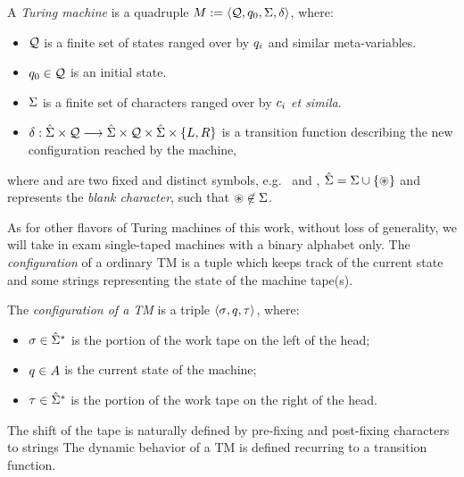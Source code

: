 \begin{defn}\label{df:TM}
A \emph{Turing machine} is a quadruple
$M:= \langle \textcolor{black}{\mathcal{Q}}, \textcolor{black}{q_0}, \textcolor{black}{\Sigma}, \textcolor{black}{\delta} \rangle$, where:
\begin{itemize}
\itemsep0em
\item $\textcolor{black}{\mathcal{Q}}$ is a finite set of states ranged over by
$\textcolor{black}{q_i}$ and similar meta-variables.
%
\item $\textcolor{black}{q_0} \in \textcolor{black}{\mathcal{Q}}$ is an initial state.
%
\item $\textcolor{black}{\Sigma}$ is a finite set of characters
ranged over by $\textcolor{black}{c_i}$ \emph{et simila}.
%
\item $\textcolor{black}{\delta}: \textcolor{black}{\hat{\Sigma}}
\times \textcolor{black}{\mathcal{Q}}
\longrightarrow \textcolor{black}{\hat{\Sigma}} \times \textcolor{black}{\mathcal{Q}} \times \textcolor{black}{\hat{\Sigma}} \times \{\textcolor{black}{L},\textcolor{black}{R}\}$
is a transition function describing the new configuration
reached by the machine,
\end{itemize}
where   and  are two fixed and distinct symbols,
e.g.~\m{$\zero$} and \m{$\one$},
$\textcolor{black}{\hat{\Sigma}}=\textcolor{black}{\Sigma} \cup \{\textcolor{black}{\circledast}\}$
and \m{$\blank$} represents the
\emph{blank character}, such that $\textcolor{black}{\circledast} \not \in
\textcolor{black}{\Sigma}$.
\end{defn}
%
\noindent
As for other flavors of Turing machines of this work,
without loss of generality, we will take in exam single-taped machines
with a binary alphabet only.
%
%
%
%
%
%
%
The \emph{configuration} of a ordinary TM is
a tuple which keeps track of the current state
and some strings representing the state of the
machine tape(s).


\begin{defn}[Configuration of a TM]\label{df:TMConfiguration}
The \emph{configuration of a TM}
is a triple $\langle \textcolor{black}{\sigma},
\textcolor{black}{q}, \textcolor{black}{\tau}\rangle$,
where:
\begin{itemize}
\itemsep0em
%
\item $\textcolor{black}{\sigma} \in \hat{\Sigma}^*$
is the portion of the work tape on the left of the head;
%
\item $\textcolor{black}{q}\in A$ is the current state of the machine;
%
\item $\textcolor{black}{\tau} \in \hat{\Sigma}^*$ is the portion of the
work tape on the right of the head.
%
\end{itemize}
\end{defn}
%
%
\noindent
The shift of the tape is naturally defined by
pre-fixing and post-fixing characters to strings
%
%
%
%
%
The dynamic behavior of a TM is defined
recurring to a transition function.



